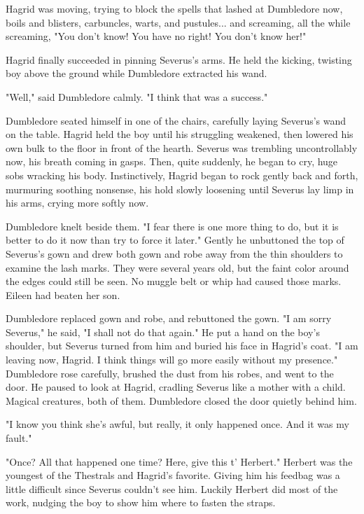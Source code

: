 \documentclass[a4paper,11pt]{article}
\begin{document}
Hagrid was moving, trying to block the spells that lashed at Dumbledore now, boils and blisters, carbuncles, warts, and pustules... and screaming, all the while screaming, "You don't know! You have no right! You don't know her!"

Hagrid finally succeeded in pinning Severus's arms. He held the kicking, twisting boy above the ground while Dumbledore extracted his wand.

"Well," said Dumbledore calmly. "I think that was a success."

Dumbledore seated himself in one of the chairs, carefully laying Severus's wand on the table. Hagrid held the boy until his struggling weakened, then lowered his own bulk to the floor in front of the hearth. Severus was trembling uncontrollably now, his breath coming in gasps. Then, quite suddenly, he began to cry, huge sobs wracking his body. Instinctively, Hagrid began to rock gently back and forth, murmuring soothing nonsense, his hold slowly loosening until Severus lay limp in his arms, crying more softly now.

Dumbledore knelt beside them. "I fear there is one more thing to do, but it is better to do it now than try to force it later." Gently he unbuttoned the top of Severus's gown and drew both gown and robe away from the thin shoulders to examine the lash marks. They were several years old, but the faint color around the edges could still be seen. No muggle belt or whip had caused those marks. Eileen had beaten her son.

Dumbledore replaced gown and robe, and rebuttoned the gown. "I am sorry Severus," he said, "I shall not do that again." He put a hand on the boy's shoulder, but Severus turned from him and buried his face in Hagrid's coat. "I am leaving now, Hagrid. I think things will go more easily without my presence." Dumbledore rose carefully, brushed the dust from his robes, and went to the door. He paused to look at Hagrid, cradling Severus like a mother with a child. Magical creatures, both of them. Dumbledore closed the door quietly behind him.

"I know you think she's awful, but really, it only happened once. And it was my fault."

"Once? All that happened one time? Here, give this t' Herbert." Herbert was the youngest of the Thestrals and Hagrid's favorite. Giving him his feedbag was a little difficult since Severus couldn't see him. Luckily Herbert did most of the work, nudging the boy to show him where to fasten the straps.
\end{document}
